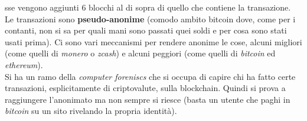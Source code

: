 \documentclass[a4paper,12pt, oneside]{book}
\begin{document}
sse vengono aggiunti 6 blocchi al di sopra di quello che contiene la
transazione.\\
Le transazioni sono \textbf{pseudo-anonime} (comodo ambito bitcoin dove,
come per i contanti, non si sa per quali mani sono passati quei soldi e per
cosa sono stati usati prima). Ci sono vari meccanismi per rendere anonime le
cose, alcuni migliori (come quelli di \textit{monero} o \textit{zcash}) e
alcuni peggiori (come quelli di \textit{bitcoin} ed \textit{ethereum}). \\
Si ha un ramo della \textit{computer foreniscs} che si occupa di capire chi ha
fatto certe transazioni, esplicitamente di criptovalute, sulla
blockchain. Quindi si prova a raggiungere l'anonimato ma non sempre si riesce
(basta un utente che paghi in \textit{bitcoin} su un sito rivelando la propria
identità).
\end{document}
